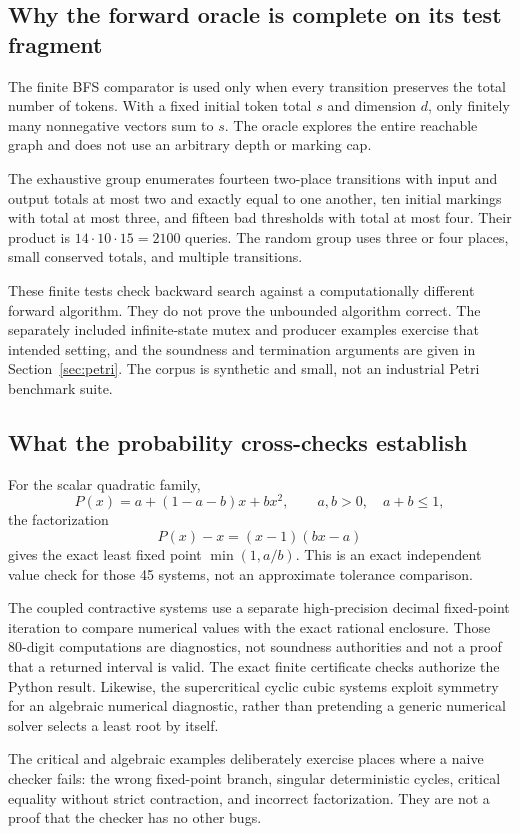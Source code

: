 \subsection{Why the forward oracle is complete on its test fragment}
The finite BFS comparator is used only when every transition preserves the total number of tokens. With a fixed initial token total $s$ and dimension $d$, only finitely many nonnegative vectors sum to $s$. The oracle explores the entire reachable graph and does not use an arbitrary depth or marking cap.

The exhaustive group enumerates fourteen two-place transitions with input and output totals at most two and exactly equal to one another, ten initial markings with total at most three, and fifteen bad thresholds with total at most four. Their product is $14\cdot10\cdot15=2100$ queries. The random group uses three or four places, small conserved totals, and multiple transitions.

These finite tests check backward search against a computationally different forward algorithm. They do not prove the unbounded algorithm correct. The separately included infinite-state mutex and producer examples exercise that intended setting, and the soundness and termination arguments are given in Section~\ref{sec:petri}. The corpus is synthetic and small, not an industrial Petri benchmark suite.

\subsection{What the probability cross-checks establish}
For the scalar quadratic family,
\[
 P(x)=a+(1-a-b)x+bx^2,
 \qquad a,b>0,\quad a+b\le1,
\]
the factorization
\[
 P(x)-x=(x-1)(bx-a)
\]
gives the exact least fixed point $\min(1,a/b)$. This is an exact independent value check for those 45 systems, not an approximate tolerance comparison.

The coupled contractive systems use a separate high-precision decimal fixed-point iteration to compare numerical values with the exact rational enclosure. Those 80-digit computations are diagnostics, not soundness authorities and not a proof that a returned interval is valid. The exact finite certificate checks authorize the Python result. Likewise, the supercritical cyclic cubic systems exploit symmetry for an algebraic numerical diagnostic, rather than pretending a generic numerical solver selects a least root by itself.

The critical and algebraic examples deliberately exercise places where a naive checker fails: the wrong fixed-point branch, singular deterministic cycles, critical equality without strict contraction, and incorrect factorization. They are not a proof that the checker has no other bugs.

